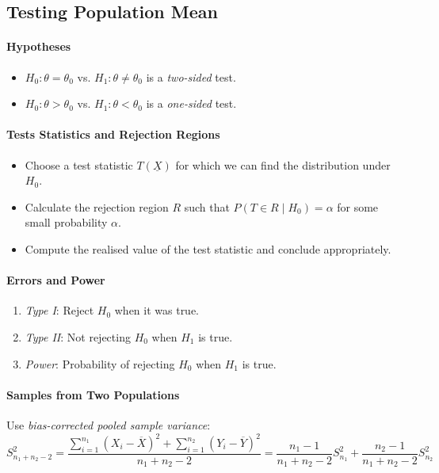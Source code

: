 \documentclass[twocolumn,english]{article}
\begin{document}
\subsection{Testing Population Mean}

\paragraph{Hypotheses}
\begin{itemize}
\item $H_{0}:\theta=\theta_{0}$ vs. $H_{1}:\theta\neq\theta_{0}$ is a
\emph{two-sided} test.
\item $H_{0}:\theta>\theta_{0}$ vs. $H_{1}:\theta<\theta_{0}$ is a \emph{one-sided}
test.
\end{itemize}

\paragraph{Tests Statistics and Rejection Regions}
\begin{itemize}
\item Choose a test statistic $T\left(\underline{X}\right)$ for which we
can find the distribution under $H_{0}$.
\item Calculate the rejection region $R$ such that $P\left(T\in R\mid H_{0}\right)=\alpha$
for some small probability $\alpha$.
\item Compute the realised value of the test statistic and conclude appropriately.
\end{itemize}

\paragraph{Errors and Power}
\begin{enumerate}
\item \emph{Type I}: Reject $H_{0}$ when it was true.
\item \emph{Type II}: Not rejecting $H_{0}$ when $H_{1}$ is true.
\item \emph{Power}: Probability of rejecting $H_{0}$ when $H_{1}$ is true.
\end{enumerate}

\paragraph{Samples from Two Populations}

Use \emph{bias-corrected pooled sample variance}:
\[
S_{n_{1}+n_{2}-2}^{2}=\frac{\sum_{i=1}^{n_{1}}\left(X_{i}-\overline{X}\right)^{2}+\sum_{i=1}^{n_{2}}\left(Y_{i}-\overline{Y}\right)^{2}}{n_{1}+n_{2}-2}=\frac{n_{1}-1}{n_{1}+n_{2}-2}S_{n_{1}}^{2}+\frac{n_{2}-1}{n_{1}+n_{2}-2}S_{n_{2}}^{2}
\]
\end{document}
